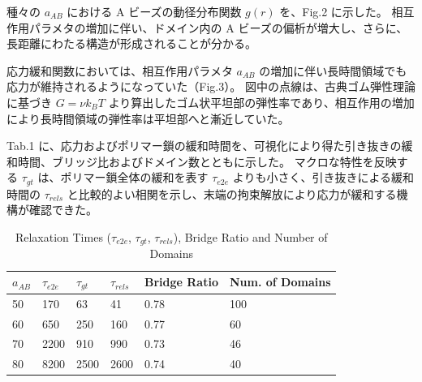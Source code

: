 \documentclass[11pt]{jsarticle}
\begin{document}
種々の $a_{AB}$ における A ビーズの動径分布関数 $g(r)$ を、Fig.2 に示した。
相互作用パラメタの増加に伴い、ドメイン内の A ビーズの偏析が増大し、さらに、長距離にわたる構造が形成されることが分かる。

応力緩和関数においては、相互作用パラメタ $a_{AB}$ の増加に伴い長時間領域でも応力が維持されるようになっていた（Fig.3）。
図中の点線は、古典ゴム弾性理論に基づき $G=\nu k_B T$ より算出したゴム状平坦部の弾性率であり、相互作用の増加により長時間領域の弾性率は平坦部へと漸近していた。

Tab.1 に、応力およびポリマー鎖の緩和時間を、可視化により得た引き抜きの緩和時間、ブリッジ比およびドメイン数とともに示した。
マクロな特性を反映する $\tau_{gt}$ は、ポリマー鎖全体の緩和を表す $\tau_{e2e}$ よりも小さく、引き抜きによる緩和時間の $\tau_{rels}$ と比較的よい相関を示し、末端の拘束解放により応力が緩和する機構が確認できた。



\begin{table}[h]
\centering
\caption{Relaxation Times ($\tau_{e2e}$, $\tau_{gt}$, $\tau_{rels}$), Bridge Ratio and Number of Domains}
\begin{tabular}{p{4em} p{4em} p{4em} p{4em} p{8em} p{10em}} \hline
\hfil $a_{AB}$ \hfil	&	\hfil $\tau_{e2e}$ \hfil	&	\hfil $\tau_{gt}$ \hfil	&	\hfil $\tau_{rels}$ \hfil	&	\hfil Bridge Ratio \hfil	&	\hfil Num. of Domains \hfil	\\ \hline \hline
\hfil 50 \hfil			&	\hfil 170 \hfil				&	\hfil 63 \hfil			&	\hfil 41 \hfil				&	\hfil 0.78 \hfil			&	\hfil 100 \hfil	\\ 
\hfil 60 \hfil			&	\hfil 650 \hfil				&	\hfil 250 \hfil			&	\hfil 160 \hfil				&	\hfil 0.77 \hfil			&	\hfil 60 \hfil	\\ 
\hfil 70 \hfil			&	\hfil 2200 \hfil			&	\hfil 910 \hfil			&	\hfil 990 \hfil				&	\hfil 0.73 \hfil			&	\hfil 46 \hfil	\\ 
\hfil 80 \hfil			&	\hfil 8200 \hfil			&	\hfil 2500 \hfil		&	\hfil 2600 \hfil			&	\hfil 0.74 \hfil			&	\hfil 40 \hfil	\\ \hline
\end{tabular}
\label{tbl:t}
\end{table}
\end{document}
